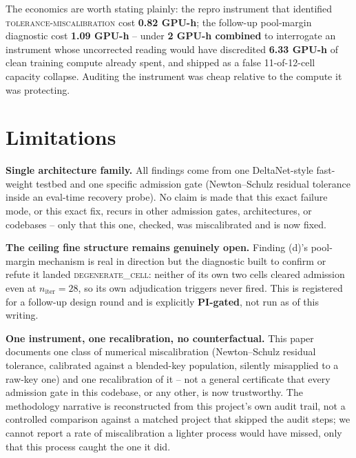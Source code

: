 \documentclass[10pt,letterpaper]{article}
\newcommand{\niter}{n_{\mathrm{iter}}}
\begin{document}
The economics are worth stating plainly: the repro instrument that
identified \textsc{tolerance-miscalibration} cost \textbf{0.82 GPU-h};
the follow-up pool-margin diagnostic cost \textbf{1.09 GPU-h} -- under
\textbf{2 GPU-h combined} to interrogate an instrument whose uncorrected
reading would have discredited \textbf{6.33 GPU-h} of clean training
compute already spent, and shipped as a false 11-of-12-cell capacity
collapse. Auditing the instrument was cheap relative to the compute it
was protecting.

\section{Limitations}
\label{sec:limitations}

\textbf{Single architecture family.} All findings come from one
DeltaNet-style fast-weight testbed and one specific admission gate
(Newton--Schulz residual tolerance inside an eval-time recovery probe).
No claim is made that this exact failure mode, or this exact fix,
recurs in other admission gates, architectures, or codebases -- only that
this one, checked, was miscalibrated and is now fixed.

\textbf{The ceiling fine structure remains genuinely open.} Finding (d)'s
pool-margin mechanism is real in direction but the diagnostic built to
confirm or refute it landed \textsc{degenerate\_cell}: neither of its own
two cells cleared admission even at $\niter=28$, so its own adjudication
triggers never fired. This is registered for a follow-up design round and
is explicitly \textbf{PI-gated}, not run as of this writing.

\textbf{One instrument, one recalibration, no counterfactual.} This paper
documents one class of numerical miscalibration (Newton--Schulz residual
tolerance, calibrated against a blended-key population, silently
misapplied to a raw-key one) and one recalibration of it -- not a general
certificate that every admission gate in this codebase, or any other, is
now trustworthy. The methodology narrative is reconstructed from this
project's own audit trail, not a controlled comparison against a matched
project that skipped the audit steps; we cannot report a rate of
miscalibration a lighter process would have missed, only that this
process caught the one it did.
\end{document}
